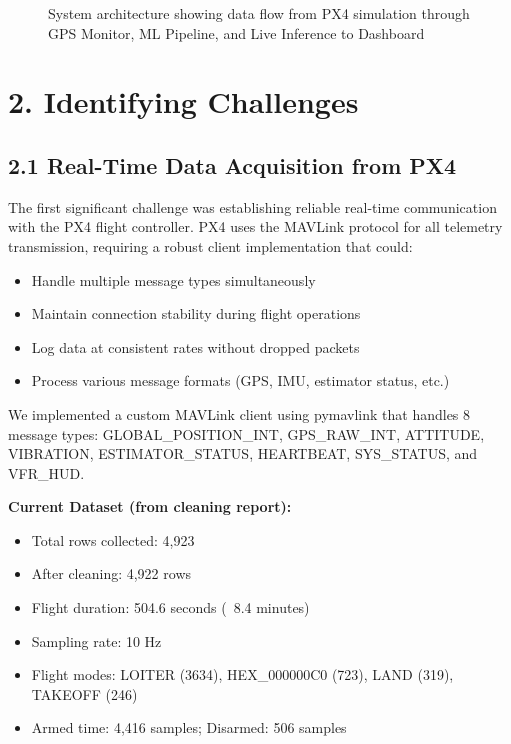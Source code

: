 \documentclass[12pt,a4paper]{article}
\begin{document}
\begin{figure}[h]
\centering
{}
\caption{System architecture showing data flow from PX4 simulation through GPS Monitor, ML Pipeline, and Live Inference to Dashboard}
\label{fig:system_architecture}
\end{figure}

\newpage

\section{2. Identifying Challenges}

\subsection{2.1 Real-Time Data Acquisition from PX4}

The first significant challenge was establishing reliable real-time communication with the PX4 flight controller. PX4 uses the MAVLink protocol for all telemetry transmission, requiring a robust client implementation that could:

\begin{itemize}
    \item Handle multiple message types simultaneously
    \item Maintain connection stability during flight operations
    \item Log data at consistent rates without dropped packets
    \item Process various message formats (GPS, IMU, estimator status, etc.)
\end{itemize}

We implemented a custom MAVLink client using pymavlink that handles 8 message types: GLOBAL\_POSITION\_INT, GPS\_RAW\_INT, ATTITUDE, VIBRATION, ESTIMATOR\_STATUS, HEARTBEAT, SYS\_STATUS, and VFR\_HUD.

\textbf{Current Dataset (from cleaning report):}
\begin{itemize}
    \item Total rows collected: 4,923
    \item After cleaning: 4,922 rows
    \item Flight duration: 504.6 seconds (~8.4 minutes)
    \item Sampling rate: 10 Hz
    \item Flight modes: LOITER (3634), HEX\_000000C0 (723), LAND (319), TAKEOFF (246)
    \item Armed time: 4,416 samples; Disarmed: 506 samples
\end{itemize}
\end{document}
